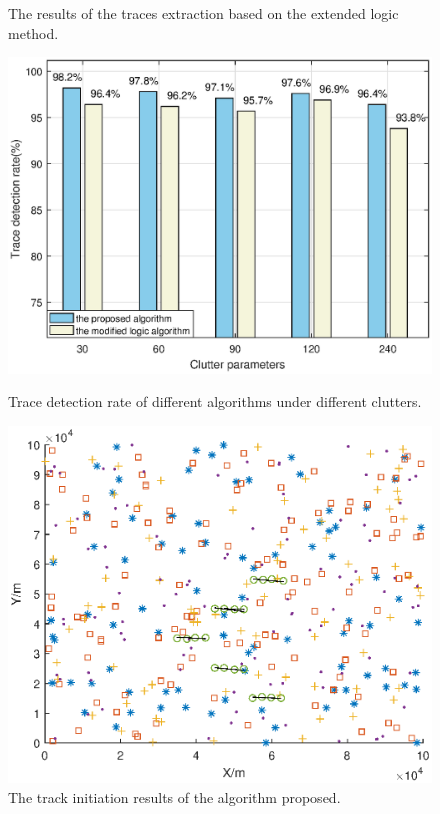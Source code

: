 \documentclass[default,iicol]{sn-jnl}%
\theoremstyle{thmstyleone}%
\theoremstyle{thmstyletwo}%
\theoremstyle{thmstylethree}%
\begin{document}
\begin{figure}[hb]
\begin{minipage}[b]{0.245\textwidth}
        \caption{The results of the traces extraction based on the extended logic method.}\label{fig9}
    \end{minipage}
    \begin{minipage}[b]{0.245\textwidth}
        \hspace{-7mm}
        \includegraphics[width=1.15\linewidth,height=0.9\linewidth]{fig10.eps}
        \caption{Trace detection rate of different algorithms under different clutters.}\label{fig10}
    \end{minipage}
    \begin{minipage}[b]{0.245\textwidth}
        \hspace{-7mm}
        \includegraphics[width=1.2\linewidth]{fig11.eps}
        \caption{The track initiation results of the algorithm proposed.}\label{fig11}
    \end{minipage}
\end{figure}
\end{document}
